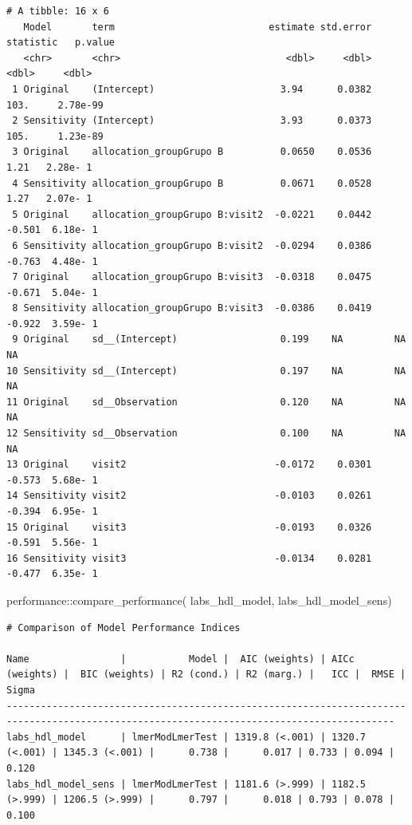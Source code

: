 \documentclass[
  12pt,
]{article}
\newenvironment{Shaded}{\begin{snugshade}}{\end{snugshade}}
\newcommand{\FunctionTok}[1]{\textcolor[rgb]{0.28,0.35,0.67}{#1}}
\newcommand{\NormalTok}[1]{\textcolor[rgb]{0.00,0.23,0.31}{#1}}
\newcommand{\SpecialCharTok}[1]{\textcolor[rgb]{0.37,0.37,0.37}{#1}}
\begin{document}
\begin{verbatim}
# A tibble: 16 x 6
   Model       term                           estimate std.error statistic   p.value
   <chr>       <chr>                             <dbl>     <dbl>     <dbl>     <dbl>
 1 Original    (Intercept)                      3.94      0.0382   103.     2.78e-99
 2 Sensitivity (Intercept)                      3.93      0.0373   105.     1.23e-89
 3 Original    allocation_groupGrupo B          0.0650    0.0536     1.21   2.28e- 1
 4 Sensitivity allocation_groupGrupo B          0.0671    0.0528     1.27   2.07e- 1
 5 Original    allocation_groupGrupo B:visit2  -0.0221    0.0442    -0.501  6.18e- 1
 6 Sensitivity allocation_groupGrupo B:visit2  -0.0294    0.0386    -0.763  4.48e- 1
 7 Original    allocation_groupGrupo B:visit3  -0.0318    0.0475    -0.671  5.04e- 1
 8 Sensitivity allocation_groupGrupo B:visit3  -0.0386    0.0419    -0.922  3.59e- 1
 9 Original    sd__(Intercept)                  0.199    NA         NA     NA       
10 Sensitivity sd__(Intercept)                  0.197    NA         NA     NA       
11 Original    sd__Observation                  0.120    NA         NA     NA       
12 Sensitivity sd__Observation                  0.100    NA         NA     NA       
13 Original    visit2                          -0.0172    0.0301    -0.573  5.68e- 1
14 Sensitivity visit2                          -0.0103    0.0261    -0.394  6.95e- 1
15 Original    visit3                          -0.0193    0.0326    -0.591  5.56e- 1
16 Sensitivity visit3                          -0.0134    0.0281    -0.477  6.35e- 1
\end{verbatim}

\begin{Shaded}
\begin{Highlighting}[]
\NormalTok{performance}\SpecialCharTok{::}\FunctionTok{compare\_performance}\NormalTok{(}
\NormalTok{    labs\_hdl\_model, }
\NormalTok{    labs\_hdl\_model\_sens) }
\end{Highlighting}
\end{Shaded}

\begin{verbatim}
# Comparison of Model Performance Indices

Name                |           Model |  AIC (weights) | AICc (weights) |  BIC (weights) | R2 (cond.) | R2 (marg.) |   ICC |  RMSE | Sigma
------------------------------------------------------------------------------------------------------------------------------------------
labs_hdl_model      | lmerModLmerTest | 1319.8 (<.001) | 1320.7 (<.001) | 1345.3 (<.001) |      0.738 |      0.017 | 0.733 | 0.094 | 0.120
labs_hdl_model_sens | lmerModLmerTest | 1181.6 (>.999) | 1182.5 (>.999) | 1206.5 (>.999) |      0.797 |      0.018 | 0.793 | 0.078 | 0.100
\end{verbatim}
\end{document}
